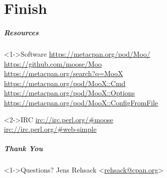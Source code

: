 \documentclass[ngerman,xcolor={table,dvipsnames},scriptsizeer,compress,hyperref={bookmarks,colorlinks}]{beamer}
\begin{document}



\part{Finish}

\begin{frame}[t,fragile]
\frametitle{Resources}
\begin{block}<1->{Software}
\url{https://metacpan.org/pod/Moo/} \\
\url{https://github.com/moose/Moo} \\
\url{https://metacpan.org/search?q=MooX} \\
\url{https://metacpan.org/pod/MooX::Cmd} \\
\url{https://metacpan.org/pod/MooX::Options} \\
\url{https://metacpan.org/pod/MooX::ConfigFromFile}
\end{block}

\begin{block}<2->{IRC}
\url{irc://irc.perl.org/#moose} \\
\url{irc://irc.perl.org/#web-simple}
\end{block}
\end{frame}

\begin{frame}[fragile]
\frametitle{Thank You}
\begin{block}<1->{Questions?}
Jens Rehsack \textless{}\href{mailto:rehsack@cpan.org}{rehsack@cpan.org}\textgreater{}
\end{block}
\end{frame}
\end{document}
